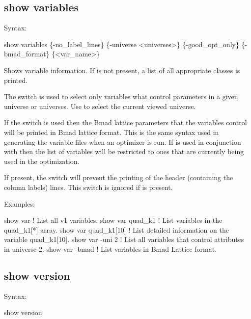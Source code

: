{{{{{{{{{{%

\subsection{show variables}
\label{s:show.variables}

Syntax:
\begin{example}
  show variables \{-no_label_lines\} \{-universe <universes>\}            
         \{-good_opt_only\} \{-bmad_format\} \{<var_name>\}
\end{example}


Shows variable information. If  is not present, a list of all appropriate 
classes is printed.

The  switch is used to select only variables what control parameters in a given
universe or universes. Use  to select the current viewed universe.

If the  switch is used then the Bmad lattice parameters that the \tao variables
control will be printed in Bmad lattice format. This is the same syntax used in generating the
variable files when an optimizer is run. If  is used in conjunction with
 then the list of variables will be restricted to ones that are currently being
used in the optimization.

If present, the  switch will prevent the printing of the header (containing the
column labels) lines. This switch is ignored if  is present.

Examples:
\begin{example}
  show var             ! List all v1 variables.
  show var quad_k1     ! List variables in the quad_k1[*] array.
  show var quad_k1[10] ! List detailed information on the variable quad_k1[10].
  show var -uni 2      ! List all variables that control attributes in universe 2.
  show var -bmad       ! List variables in Bmad Lattice format.
\end{example}


\subsection{show version}
\label{s:show.version}

Syntax:
\begin{example}
  show version 
\end{example}

}}}}}}}}}}
